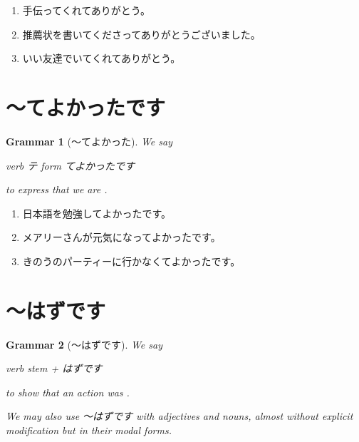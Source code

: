 \documentclass[notoc,notitlepage]{tufte-book}
\newtheorem{grammar}{\faBook Grammar}
\begin{document}
\begin{eg}
  \begin{enumerate}
    \item 手伝ってくれてありがとう。
    \item 推薦状を書いてくださってありがとうございました。
    \item いい友達でいてくれてありがとう。
  \end{enumerate}
\end{eg}


\section{〜てよかったです}%
\label{sec:_teyokatsutadesu}

\begin{grammar}[〜てよかった]\label{grammar:_teyokatsuta}
  We say
  \begin{center}
    verb テ form てよかったです
  \end{center}
  to express that we are .
\end{grammar}

\begin{eg}
  \begin{enumerate}
    \item 日本語を勉強してよかったです。
    \item メアリーさんが元気になってよかったです。
    \item きのうのパーティーに行かなくてよかったです。
  \end{enumerate}
\end{eg}


\section{〜はずです}%
\label{sec:_hazudesu}

\begin{grammar}[〜はずです]\label{grammar:_hazudesu}
  We say
  \begin{center}
    verb stem + はずです
  \end{center}
  to show that an action was .

  We may also use 〜はずです with adjectives and nouns,
  almost without explicit modification but in their modal forms.
\end{grammar}
\end{document}
